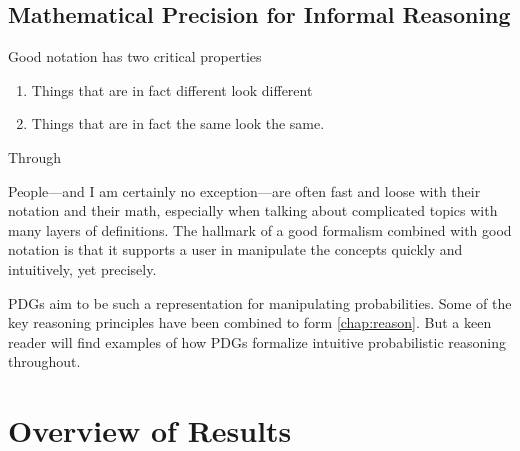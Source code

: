 %


\subsection{Mathematical Precision for Informal Reasoning}

Good notation has two critical properties
\begin{enumerate}
    \item Things that are in fact different look different
    \item Things that are in fact the same look the same. 
\end{enumerate}
Through 

\TODO


People---and I am certainly no exception---are often fast and loose with their notation and their math, especially when talking about complicated topics with many layers of definitions. 
%
The hallmark of a good formalism combined with good notation is that it supports a user in manipulate the concepts quickly and intuitively, yet precisely.
    

PDGs aim to be such a representation for manipulating probabilities.
Some of the key reasoning principles have been combined to form \cref{chap:reason}.
But a keen reader will find examples of how PDGs formalize intuitive probabilistic reasoning throughout. 

\section{Overview of Results}

\TODO
